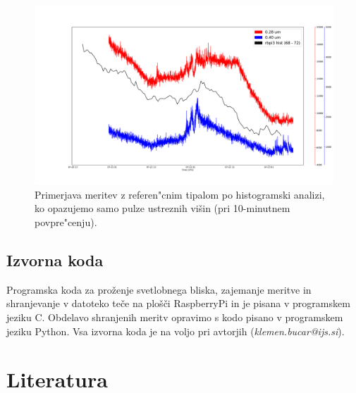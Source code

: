 \documentclass[12pt,a4paper]{article}
\begin{document}
\begin{figure}[H]
	\begin{center}
		\includegraphics[width=16cm]{hist_comparison.pdf}
		\caption{Primerjava meritev z referen"cnim tipalom po histogramski analizi, ko opazujemo samo pulze ustreznih višin (pri 10-minutnem povpre"cenju).}
		\label{hist_comparison}
	\end{center}
\end{figure}

\clearpage

\begin{appendices}
	\section{Izvorna koda}

Programska koda za proženje svetlobnega bliska, zajemanje meritve in shranjevanje v datoteko teče na plošči RaspberryPi in je pisana v programskem jeziku C.
Obdelavo shranjenih meritv opravimo s kodo pisano v programskem jeziku Python. 
Vsa izvorna koda je na voljo pri avtorjih (\emph{klemen.bucar@ijs.si}).


\end{appendices}
\clearpage

\section{Literatura}

\printbibliography[heading=none]
\end{document}
